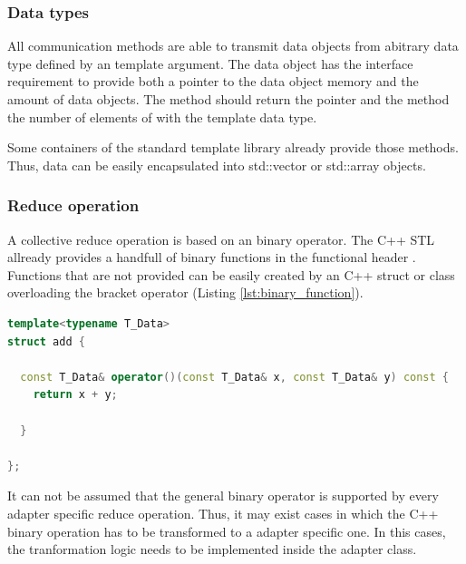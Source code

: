\subsubsection{Data types}
All communication methods are able to transmit data objects from
abitrary data type defined by an template argument. The data object
has the interface requirement to provide both a pointer to the data
object memory and the amount of data objects. The method 
should return the pointer and the method  the number of
elements of with the template data type.

Some containers of the standard template library already provide those
methods. Thus, data can be easily encapsulated into std::vector
\cite{ref:vector} or std::array \cite{ref:array} objects.

\subsubsection{Reduce operation}
A collective reduce operation is based on an binary operator. The C++
STL allready provides a handfull of binary functions in the functional
header \cite{ref:functional}. Functions that are not provided can be easily created 
by an C++ struct or class overloading the bracket operator \cpp{()}(Listing
\ref{lst:binary_function}). 

\begin{lstlisting}[language=C++, breaklines=false, label={lst:binary_function}]
template<typename T_Data>
struct add {

  const T_Data& operator()(const T_Data& x, const T_Data& y) const {
    return x + y;

  }

};
\end{lstlisting}

It can not be assumed that the general binary operator is supported by
every adapter specific reduce operation.  Thus, it may exist cases in
which the C++ binary operation has to be transformed to a adapter
specific one. In this cases, the tranformation logic needs to be implemented
inside the adapter class.


